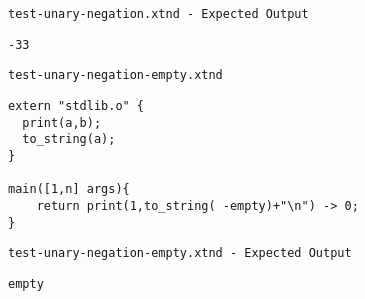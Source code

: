 \medskip \noindent \texttt{test-unary-negation.xtnd - Expected Output}


\begin{lstlisting}
-33
\end{lstlisting}


\medskip \noindent \texttt{test-unary-negation-empty.xtnd}


\begin{lstlisting}
extern "stdlib.o" {
  print(a,b);
  to_string(a);
}

main([1,n] args){
	return print(1,to_string( -empty)+"\n") -> 0;
}
\end{lstlisting}


\medskip \noindent \texttt{test-unary-negation-empty.xtnd - Expected Output}


\begin{lstlisting}
empty
\end{lstlisting}




